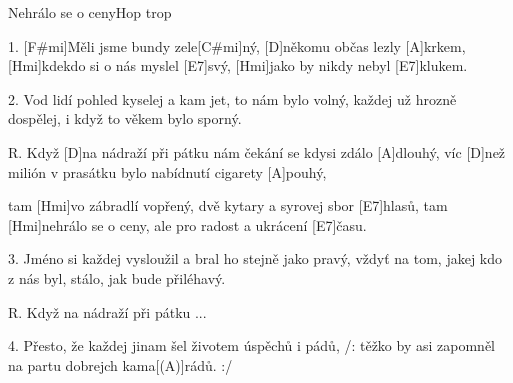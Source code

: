\begin{song}{Nehrálo se o ceny}{Hop trop}

\begin{xverse}{1. }
[F#mi]Měli jsme bundy zele[C#mi]ný,
[D]někomu občas lezly [A]krkem,
[Hmi]kdekdo si o nás myslel [E7]svý,
[Hmi]jako by nikdy nebyl [E7]klukem.
\end{xverse}

\begin{xverse}{2. }
Vod lidí pohled kyselej
a kam jet, to nám bylo volný,
každej už hrozně dospělej,
i když to věkem bylo sporný.
\end{xverse}

\begin{xverse}{R. }
Když [D]na nádraží při pátku
nám čekání se kdysi zdálo [A]dlouhý,
víc [D]než milión v prasátku
bylo nabídnutí cigarety [A]pouhý,
\end{xverse}

\begin{xverse}{}
tam [Hmi]vo zábradlí vopřený, dvě kytary
a syrovej sbor [E7]hlasů,
tam [Hmi]nehrálo se o ceny,
ale pro radost a ukrácení [E7]{ča}su.
\end{xverse}

\begin{xverse}{3. }
Jméno si každej vysloužil
a bral ho stejně jako pravý,
vždyť na tom, jakej kdo z nás byl,
stálo, jak bude přiléhavý.
\end{xverse}

\begin{xverse}{R. }
Když na nádraží při pátku ...
\end{xverse}

\begin{xverse}{4. }
Přesto, že každej jinam šel
životem úspěchů i pádů,
/: těžko by asi zapomněl
na partu dobrejch kama[(A)]rádů. :/
\end{xverse}

\end{song}

